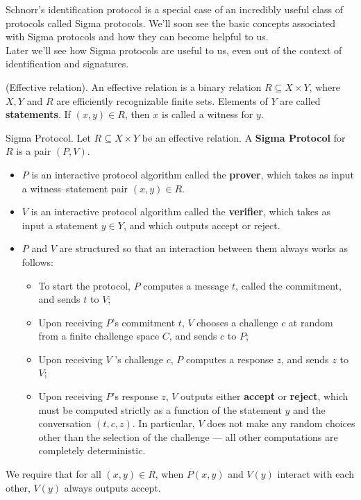 Schnorr\textquoteright s identification protocol is a special case
of an incredibly useful class of protocols called Sigma protocols.
We'll soon see the basic concepts associated with Sigma protocols
and how they can become helpful to us.\\
Later we'll see how Sigma protocols are useful to us, even out of
the context of identification and signatures.
\begin{defn}
(Effective relation). An effective relation is a binary relation $R\subseteq X\times Y$,
where $X,Y$ and $R$ are efficiently recognizable finite sets. Elements
of $Y$ are called \textbf{statements}. If $\left(x,y\right)\in R$,
then $x$ is called a witness for $y$.
\end{defn}

\begin{defn}
Sigma Protocol. Let $R\subseteq X\times Y$ be an effective relation.
A \textbf{Sigma Protocol }for $R$ is a pair $\left(P,V\right)$.
\begin{itemize}
\item $P$ is an interactive protocol algorithm called the \textbf{prover},
which takes as input a witness--statement pair $\left(x,y\right)\in R$.
\item $V$ is an interactive protocol algorithm called the \textbf{verifier},
which takes as input a statement $y\in Y$, and which outputs accept
or reject.
\item $P$ and $V$ are structured so that an interaction between them always
works as follows:
\begin{itemize}
\item To start the protocol, $P$ computes a message $t$, called the commitment,
and sends $t$ to $V$;
\item Upon receiving $P$\textquoteright s commitment $t$, $V$ chooses
a challenge $c$ at random from a finite challenge space $C$, and
sends $c$ to $P$;
\item Upon receiving $V$ \textquoteright s challenge $c$, $P$ computes
a response $z$, and sends $z$ to $V$;
\item Upon receiving $P$\textquoteright s response $z$, $V$ outputs either
\textbf{accept} or \textbf{reject}, which must be computed strictly
as a function of the statement $y$ and the conversation $\left(t,c,z\right)$.
In particular, $V$ does not make any random choices other than the
selection of the challenge --- all other computations are completely
deterministic.
\end{itemize}
\end{itemize}
We require that for all $\left(x,y\right)\in R$, when $P\left(x,y\right)$
and $V\left(y\right)$ interact with each other, $V\left(y\right)$
always outputs accept.
\end{defn}


